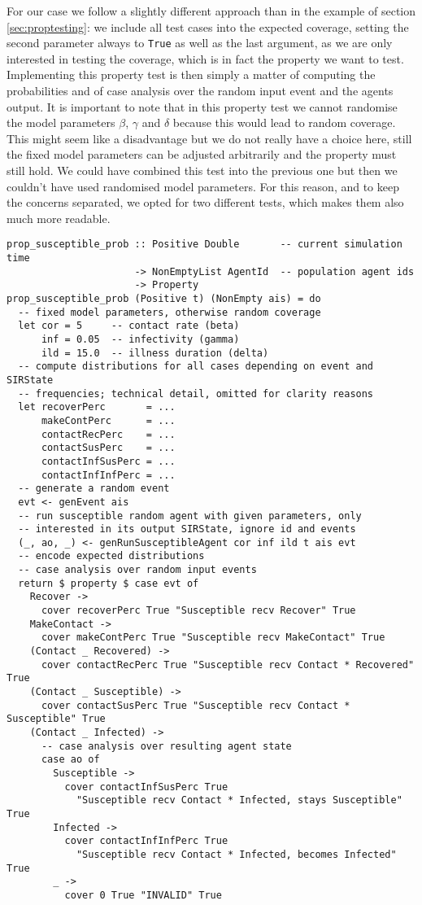 For our case we follow a slightly different approach than in the example of section \ref{sec:proptesting}: we include all test cases into the expected coverage, setting the second parameter always to \texttt{True} as well as the last argument, as we are only interested in testing the coverage, which is in fact the property we want to test. Implementing this property test is then simply a matter of computing the probabilities and of case analysis over the random input event and the agents output. It is important to note that in this property test we cannot randomise the model parameters $\beta$, $\gamma$ and $\delta$ because this would lead to random coverage. This might seem like a disadvantage but we do not really have a choice here, still the fixed model parameters can be adjusted arbitrarily and the property must still hold. We could have combined this test into the previous one but then we couldn't have used randomised model parameters. For this reason, and to keep the concerns separated, we opted for two different tests, which makes them also much more readable. 

\begin{footnotesize}
\begin{verbatim}
prop_susceptible_prob :: Positive Double       -- current simulation time
                      -> NonEmptyList AgentId  -- population agent ids 
                      -> Property
prop_susceptible_prob (Positive t) (NonEmpty ais) = do
  -- fixed model parameters, otherwise random coverage
  let cor = 5     -- contact rate (beta)
      inf = 0.05  -- infectivity (gamma)
      ild = 15.0  -- illness duration (delta)
  -- compute distributions for all cases depending on event and SIRState
  -- frequencies; technical detail, omitted for clarity reasons
  let recoverPerc       = ...
      makeContPerc      = ...
      contactRecPerc    = ...
      contactSusPerc    = ...
      contactInfSusPerc = ...
      contactInfInfPerc = ...
  -- generate a random event
  evt <- genEvent ais
  -- run susceptible random agent with given parameters, only
  -- interested in its output SIRState, ignore id and events
  (_, ao, _) <- genRunSusceptibleAgent cor inf ild t ais evt
  -- encode expected distributions
  -- case analysis over random input events
  return $ property $ case evt of 
    Recover -> 
      cover recoverPerc True "Susceptible recv Recover" True
    MakeContact -> 
      cover makeContPerc True "Susceptible recv MakeContact" True
    (Contact _ Recovered) -> 
      cover contactRecPerc True "Susceptible recv Contact * Recovered" True
    (Contact _ Susceptible) -> 
      cover contactSusPerc True "Susceptible recv Contact * Susceptible" True
    (Contact _ Infected) -> 
      -- case analysis over resulting agent state
      case ao of
        Susceptible ->
          cover contactInfSusPerc True 
            "Susceptible recv Contact * Infected, stays Susceptible" True
        Infected ->
          cover contactInfInfPerc True 
            "Susceptible recv Contact * Infected, becomes Infected" True
        _ ->
          cover 0 True "INVALID" True
\end{verbatim}
\end{footnotesize}

